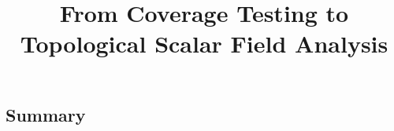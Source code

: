 \documentclass[12pt]{article}
\begin{document}
\title{From Coverage Testing to Topological Scalar Field Analysis}
\maketitle



\subsection{Summary}


%
%   
%
%   
%
%
%
%   
%
\end{document}
